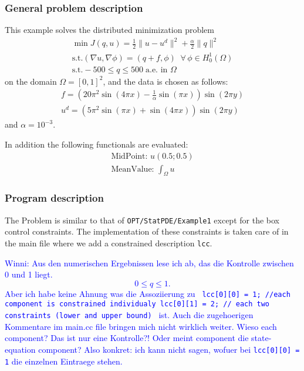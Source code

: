 \subsubsection{General problem description}
This example solves the distributed minimization problem
\begin{gather*}
\min J(q,u) = \frac{1}{2} \|u-u^d\|^2 + \frac{\alpha}{2}\|q\|^2\\
\text{s.t.} (\nabla u,\nabla \phi) = (q+f,\phi)\;\;\forall\,\phi \in H^1_0(\Omega)\\
\text{s.t.} -500 \le q \le 500\;\text{a.e. in }\Omega
\end{gather*}
on the domain $\Omega = [0,1]^2$, and the data is chosen as follows:
\begin{gather*}
 f = \left(20\pi^2  \sin(4 \pi x) - \frac{1}{\alpha}  \sin(\pi x)\right) \sin(2 \pi y)\\
 u^d = \left( 5 \pi^2 \sin(\pi x) + \sin(4 \pi x)\right)  \sin(2\pi y)
\end{gather*}
and $\alpha = 10^{-3}$.

In addition the following functionals are evaluated:
\begin{gather*}
  \text{MidPoint: } u(0.5 ; 0.5)\\[2mm]
  \text{MeanValue: }\int_\Omega u
\end{gather*}


\subsubsection{Program description}
{
The Problem is similar to that of {\tt OPT/StatPDE/Example1} except for the box control constraints.
The implementation of these constraints is taken care of in the main file
where we add a constrained description \texttt{lcc}.
}

\textcolor{blue}{Winni: Aus den numerischen 
Ergebnissen lese ich ab, das die Kontrolle zwischen 0 und 1 liegt.
\[
0 \leq q \leq 1.
\]
 Aber ich habe keine Ahnung was die Assoziierung zu 
\texttt{
lcc[0][0] = 1; //each component is constrained individualy
  lcc[0][1] = 2; // each two constraints (lower and upper bound)
}
ist. Auch die zugehoerigen Kommentare im main.cc file bringen mich nicht
  wirklich
weiter. Wieso each component? Das ist nur eine Kontrolle?! Oder meint
  component die state-equation component? 
Also konkret: ich kann nicht sagen, wofuer bei \texttt{lcc[0][0] = 1}  die 
einzelnen Eintraege stehen.
}

